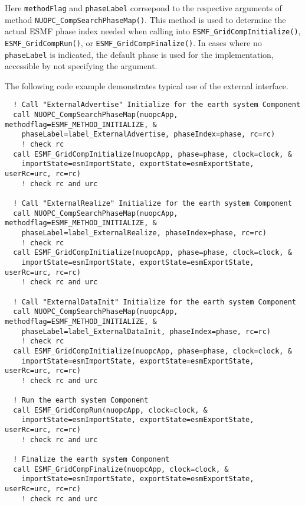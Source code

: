 Here {\tt methodFlag} and {\tt phaseLabel} corrsepond to the respective arguments of method {\tt NUOPC\_CompSearchPhaseMap()}. This method is used to determine the actual ESMF phase index needed when calling into {\tt ESMF\_GridCompInitialize()}, {\tt ESMF\_GridCompRun()}, or {\tt ESMF\_GridCompFinalize()}. In cases where no {\tt phaseLabel} is indicated, the default phase is used for the implementation, accessible by not specifying the argument.

The following code example demonstrates typical use of the external interface.

\begin{verbatim}
  ! Call "ExternalAdvertise" Initialize for the earth system Component
  call NUOPC_CompSearchPhaseMap(nuopcApp, methodflag=ESMF_METHOD_INITIALIZE, &
    phaseLabel=label_ExternalAdvertise, phaseIndex=phase, rc=rc)
    ! check rc
  call ESMF_GridCompInitialize(nuopcApp, phase=phase, clock=clock, &
    importState=esmImportState, exportState=esmExportState, userRc=urc, rc=rc)
    ! check rc and urc

  ! Call "ExternalRealize" Initialize for the earth system Component
  call NUOPC_CompSearchPhaseMap(nuopcApp, methodflag=ESMF_METHOD_INITIALIZE, &
    phaseLabel=label_ExternalRealize, phaseIndex=phase, rc=rc)
    ! check rc
  call ESMF_GridCompInitialize(nuopcApp, phase=phase, clock=clock, &
    importState=esmImportState, exportState=esmExportState, userRc=urc, rc=rc)
    ! check rc and urc

  ! Call "ExternalDataInit" Initialize for the earth system Component
  call NUOPC_CompSearchPhaseMap(nuopcApp, methodflag=ESMF_METHOD_INITIALIZE, &
    phaseLabel=label_ExternalDataInit, phaseIndex=phase, rc=rc)
    ! check rc
  call ESMF_GridCompInitialize(nuopcApp, phase=phase, clock=clock, &
    importState=esmImportState, exportState=esmExportState, userRc=urc, rc=rc)
    ! check rc and urc

  ! Run the earth system Component
  call ESMF_GridCompRun(nuopcApp, clock=clock, &
    importState=esmImportState, exportState=esmExportState, userRc=urc, rc=rc)
    ! check rc and urc

  ! Finalize the earth system Component
  call ESMF_GridCompFinalize(nuopcApp, clock=clock, &
    importState=esmImportState, exportState=esmExportState, userRc=urc, rc=rc)
    ! check rc and urc
\end{verbatim}




